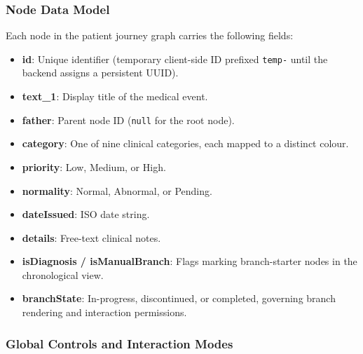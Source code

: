 \subsubsection{Node Data Model}

Each node in the patient journey graph carries the following fields:
\begin{itemize}
    \item \textbf{id}: Unique identifier (temporary client-side ID prefixed
          \texttt{temp-} until the backend assigns a persistent UUID).
    \item \textbf{text\_1}: Display title of the medical event.
    \item \textbf{father}: Parent node ID (\texttt{null} for the root node).
    \item \textbf{category}: One of nine clinical categories, each mapped to
          a distinct colour.
    \item \textbf{priority}: Low, Medium, or High.
    \item \textbf{normality}: Normal, Abnormal, or Pending.
    \item \textbf{dateIssued}: ISO date string.
    \item \textbf{details}: Free-text clinical notes.
    \item \textbf{isDiagnosis / isManualBranch}: Flags marking branch-starter
          nodes in the chronological view.
    \item \textbf{branchState}: In-progress, discontinued, or completed,
          governing branch rendering and interaction permissions.
\end{itemize}

\subsubsection{Global Controls and Interaction Modes}

